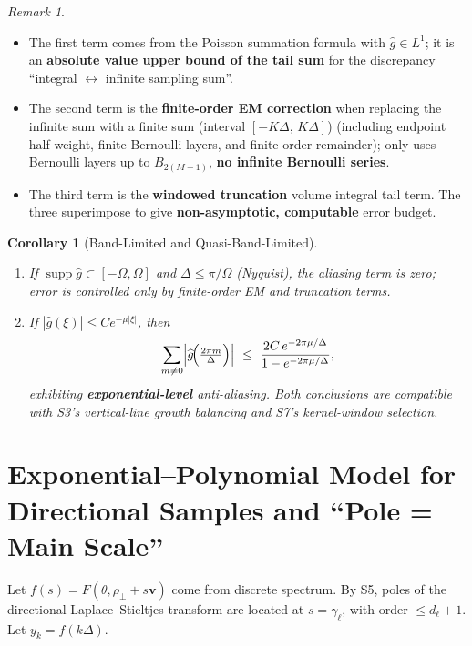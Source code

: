 \documentclass[11pt,a4paper]{article}
\newtheorem{corollary}[theorem]{Corollary}
\theoremstyle{remark}
\newtheorem{remark}[theorem]{Remark}
\DeclareMathOperator{\supp}{supp}
\begin{document}
\begin{remark}
\begin{itemize}
\item The first term comes from the Poisson summation formula with $\widehat{g}\in L^1$; it is an \textbf{absolute value upper bound of the tail sum} for the discrepancy ``integral $\leftrightarrow$ infinite sampling sum''.
\item The second term is the \textbf{finite-order EM correction} when replacing the infinite sum with a finite sum (interval $[-K\Delta,\,K\Delta]$) (including endpoint half-weight, finite Bernoulli layers, and finite-order remainder); only uses Bernoulli layers up to $B_{2(M-1)}$, \textbf{no infinite Bernoulli series}.
\item The third term is the \textbf{windowed truncation} volume integral tail term. The three superimpose to give \textbf{non-asymptotic, computable} error budget.
\end{itemize}
\end{remark}

\begin{corollary}[Band-Limited and Quasi-Band-Limited]\label{cor:band_limited}
\begin{enumerate}
\item[(i)] If $\supp\widehat{g}\subset[-\Omega,\Omega]$ and $\Delta\le \pi/\Omega$ (Nyquist), the aliasing term is zero; error is controlled only by finite-order EM and truncation terms.
\item[(ii)] If $|\widehat{g}(\xi)|\le C e^{-\mu|\xi|}$, then
\begin{equation}
\sum_{m\ne0}\Bigl|\widehat{g}\!\Bigl(\tfrac{2\pi m}{\Delta}\Bigr)\Bigr|
\ \le\ \frac{2C\,e^{-2\pi\mu/\Delta}}{1-e^{-2\pi\mu/\Delta}},
\end{equation}
exhibiting \textbf{exponential-level} anti-aliasing. Both conclusions are compatible with S3's vertical-line growth balancing and S7's kernel-window selection.
\end{enumerate}
\end{corollary}

\section{Exponential--Polynomial Model for Directional Samples and ``Pole = Main Scale''}

Let $f(s)=F(\theta,\rho_\perp+s\mathbf{v})$ come from discrete spectrum. By S5, poles of the directional Laplace--Stieltjes transform are located at $s=\gamma_\ell$, with order $\le d_\ell+1$. Let $y_k=f(k\Delta)$.
\end{document}
